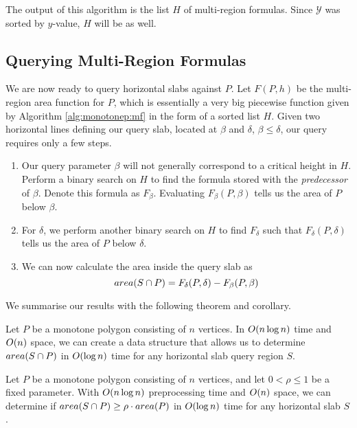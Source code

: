 The output of this algorithm is the list $H$ of multi-region formulas. Since $\mathcal{Y}$ was sorted by $y$-value, $H$ will be as well.


\subsection{Querying Multi-Region Formulas}
\label{:monotonep:query-mf}

We are now ready to query horizontal slabs against $P$. 
Let $F(P,h)$ be the multi-region area function for $P$, which is essentially a very big piecewise function given by Algorithm \ref{alg:monotonep:mf} in the form of a sorted list $H$.
Given two horizontal lines defining our query slab, located at $\beta$ and $\delta$, $\beta \leq \delta$, our query requires only a few steps.

\begin{enumerate}
\item Our query parameter $\beta$ will not generally correspond to a critical height in $H$.
Perform a binary search on $H$ to find the formula stored with the \emph{predecessor} of $\beta$.
Denote this formula as $F_\beta$. 
Evaluating $F_\beta(P, \beta)$ tells us the area of $P$ below $\beta$.

\item For $\delta$, we perform another binary search on $H$ to find $F_\delta$ such that $F_\delta(P, \delta)$ tells us the area of $P$ below $\delta$.

\item We can now calculate the area inside the query slab as
\[ 
area(S \cap P) = F_\delta(P, \delta) - F_\beta(P, \beta)
\]

\end{enumerate}

\noindent
We summarise our results with the following theorem and corollary.

\begin{theorem}
\label{th:montonep:slab-area}
Let $P$ be a monotone polygon consisting of $n$ vertices. In $O\!\left(n \log{n}\right)$ time and $O\!\left(n\right)$ space, we can create a data structure that allows us to determine $area(S \cap P)$ in $O\!\left(\log{n}\right)$ time for any horizontal slab query region $S$.
\end{theorem}

\begin{corollary}
\label{cor:montonep:slab-mp}
Let $P$ be a monotone polygon consisting of $n$ vertices, and let $0 < \rho \leq 1$ be a fixed parameter. 
With $O\!\left(n \log{n}\right)$ preprocessing time and $O\!\left(n\right)$ space, we can determine if $area(S \cap P) \geq \rho \cdot area(P)$ in $O\!\left(\log{n}\right)$ time for any horizontal slab $S$.
\end{corollary}


